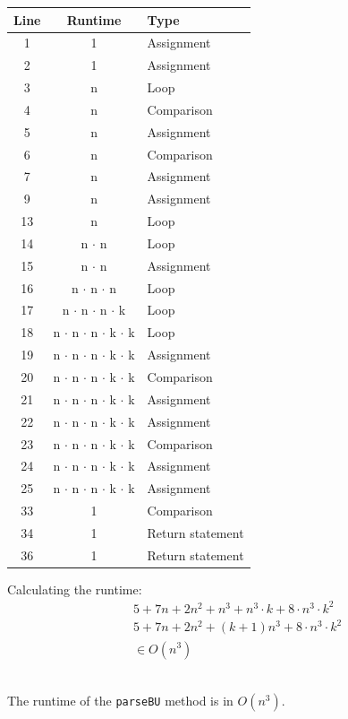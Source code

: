\documentclass[a4paper, 11pt]{article}
\begin{document}
\begin{minipage}{0.6\textwidth}

\begin{tabular}{|c|c|l|}
\hline
Line & Runtime & Type \\
\hline
1 &  1 & Assignment \\
2 & 1 & Assignment \\
3 & n & Loop \\
4 &  n &  Comparison\\
5 & n  & Assignment\\
6 & n &  Comparison\\
7 & n &  Assignment \\
9 & n & Assignment \\
13 & n & Loop \\
14 & n $\cdot$ n& Loop\\
15  & n $\cdot$ n  & Assignment \\
16 & n $\cdot$ n $\cdot$ n & Loop \\
17  & n $\cdot$ n $\cdot$ n $\cdot$ k & Loop \\
18  & n $\cdot$ n $\cdot$ n $\cdot$ k $\cdot$ k & Loop \\
19 & n $\cdot$ n $\cdot$ n $\cdot$ k $\cdot$ k & Assignment\\
20 & n $\cdot$ n $\cdot$ n $\cdot$ k $\cdot$ k & Comparison\\
21 & n $\cdot$ n $\cdot$ n $\cdot$ k $\cdot$ k & Assignment\\
22& n $\cdot$ n $\cdot$ n $\cdot$ k $\cdot$ k & Assignment\\
23 & n $\cdot$ n $\cdot$ n $\cdot$ k $\cdot$ k & Comparison\\
24  & n $\cdot$ n $\cdot$ n $\cdot$ k $\cdot$ k & Assignment \\
25   & n $\cdot$ n $\cdot$ n $\cdot$ k $\cdot$ k & Assignment\\
33 & 1 & Comparison\\
34 & 1 & Return statement\\
36  & 1 &  Return statement\\
\hline
\end{tabular}


\end{minipage}\begin{minipage}{0.4\textwidth}
Calculating the runtime:
\begin{align*}
& 5 + 7n + 2n^2 + n^3 +n^3 \cdot k + 8 \cdot n^3 \cdot k^2 \\
& 5 + 7n + 2n^2 + (k+1)n^3 + 8 \cdot n^3 \cdot k^2 \\
& \in O(n^3)
\end{align*}

\end{minipage}
\ \\
The runtime of the \texttt{parseBU} method is in $O(n^3)$.
\end{document}
